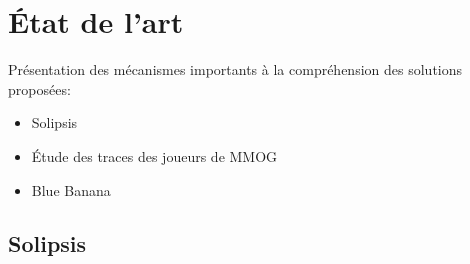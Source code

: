 \documentclass{beamer}
\begin{document}
	
  \section{État de l'art}
  \begin{frame}
	Présentation des  mécanismes importants à la compréhension des solutions proposées:\\
	\begin{itemize}
		\item Solipsis\\
		\item Étude des traces des joueurs de MMOG\\
		\item Blue Banana \\
	\end{itemize}
  \end{frame}

  \subsection{Solipsis}
\end{document}
